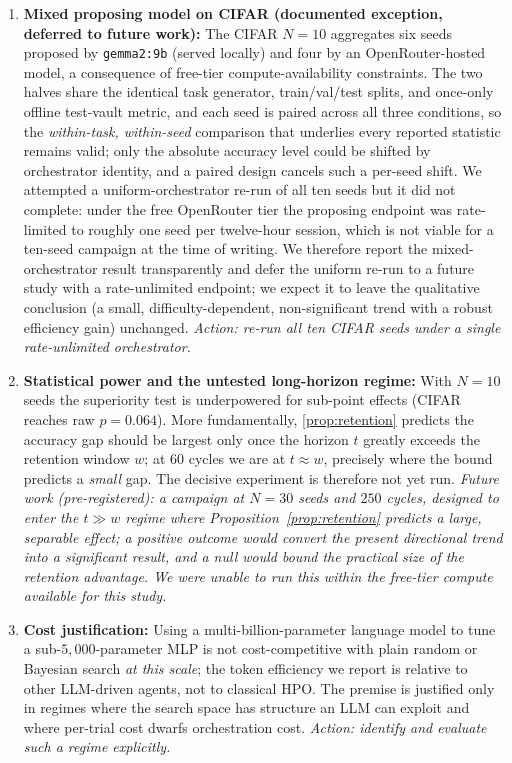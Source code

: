 \documentclass[conference]{IEEEtran}
\begin{document}
\begin{enumerate}[label=\textbf{L\arabic*.},leftmargin=2.2em,itemsep=3pt]
  \item \textbf{Mixed proposing model on CIFAR (documented exception, deferred to future work):} The CIFAR $N{=}10$ aggregates six seeds proposed by \texttt{gemma2:9b} (served locally) and four by an OpenRouter-hosted model, a consequence of free-tier compute-availability constraints. The two halves share the identical task generator, train/val/test splits, and once-only offline test-vault metric, and each seed is paired across all three conditions, so the \emph{within-task, within-seed} comparison that underlies every reported statistic remains valid; only the absolute accuracy level could be shifted by orchestrator identity, and a paired design cancels such a per-seed shift. We attempted a uniform-orchestrator re-run of all ten seeds but it did not complete: under the free OpenRouter tier the proposing endpoint was rate-limited to roughly one seed per twelve-hour session, which is not viable for a ten-seed campaign at the time of writing. We therefore report the mixed-orchestrator result transparently and defer the uniform re-run to a future study with a rate-unlimited endpoint; we expect it to leave the qualitative conclusion (a small, difficulty-dependent, non-significant trend with a robust efficiency gain) unchanged. \textit{Action: re-run all ten CIFAR seeds under a single rate-unlimited orchestrator.}
  \item \textbf{Statistical power and the untested long-horizon regime:} With $N{=}10$ seeds the superiority test is underpowered for sub-point effects (CIFAR reaches raw $p = 0.064$). More fundamentally, \cref{prop:retention} predicts the accuracy gap should be largest only once the horizon $t$ greatly exceeds the retention window $w$; at $60$ cycles we are at $t\!\approx\!w$, precisely where the bound predicts a \emph{small} gap. The decisive experiment is therefore not yet run. \textit{Future work (pre-registered): a campaign at $N{=}30$ seeds and $250$ cycles, designed to enter the $t\gg w$ regime where Proposition~\ref{prop:retention} predicts a large, separable effect; a positive outcome would convert the present directional trend into a significant result, and a null would bound the practical size of the retention advantage. We were unable to run this within the free-tier compute available for this study.}
  \item \textbf{Cost justification:} Using a multi-billion-parameter language model to tune a sub-$5{,}000$-parameter MLP is not cost-competitive with plain random or Bayesian search \emph{at this scale}; the token efficiency we report is relative to other LLM-driven agents, not to classical HPO. The premise is justified only in regimes where the search space has structure an LLM can exploit and where per-trial cost dwarfs orchestration cost. \textit{Action: identify and evaluate such a regime explicitly.}

\end{enumerate}
\end{document}
